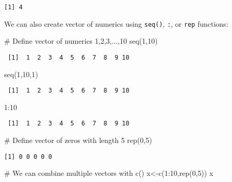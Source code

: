 \documentclass[
  letterpaper,
  DIV=11,
  numbers=noendperiod]{scrartcl}
\newenvironment{Shaded}{\begin{snugshade}}{\end{snugshade}}
\newcommand{\CommentTok}[1]{\textcolor[rgb]{0.37,0.37,0.37}{#1}}
\newcommand{\DecValTok}[1]{\textcolor[rgb]{0.68,0.00,0.00}{#1}}
\newcommand{\FunctionTok}[1]{\textcolor[rgb]{0.28,0.35,0.67}{#1}}
\newcommand{\NormalTok}[1]{\textcolor[rgb]{0.00,0.23,0.31}{#1}}
\newcommand{\OtherTok}[1]{\textcolor[rgb]{0.00,0.23,0.31}{#1}}
\newcommand{\SpecialCharTok}[1]{\textcolor[rgb]{0.37,0.37,0.37}{#1}}
\begin{document}
\begin{verbatim}
[1] 4
\end{verbatim}

We can also create vector of numerics using \texttt{seq()}, \texttt{:},
or \texttt{rep} functions:

\begin{Shaded}
\begin{Highlighting}[]
\CommentTok{\# Define vector of numerics 1,2,3,...,10}
\FunctionTok{seq}\NormalTok{(}\DecValTok{1}\NormalTok{,}\DecValTok{10}\NormalTok{)}
\end{Highlighting}
\end{Shaded}

\begin{verbatim}
 [1]  1  2  3  4  5  6  7  8  9 10
\end{verbatim}

\begin{Shaded}
\begin{Highlighting}[]
\FunctionTok{seq}\NormalTok{(}\DecValTok{1}\NormalTok{,}\DecValTok{10}\NormalTok{,}\DecValTok{1}\NormalTok{)}
\end{Highlighting}
\end{Shaded}

\begin{verbatim}
 [1]  1  2  3  4  5  6  7  8  9 10
\end{verbatim}

\begin{Shaded}
\begin{Highlighting}[]
\DecValTok{1}\SpecialCharTok{:}\DecValTok{10}
\end{Highlighting}
\end{Shaded}

\begin{verbatim}
 [1]  1  2  3  4  5  6  7  8  9 10
\end{verbatim}

\begin{Shaded}
\begin{Highlighting}[]
\CommentTok{\# Define vector of zeros with length 5}
\FunctionTok{rep}\NormalTok{(}\DecValTok{0}\NormalTok{,}\DecValTok{5}\NormalTok{)}
\end{Highlighting}
\end{Shaded}

\begin{verbatim}
[1] 0 0 0 0 0
\end{verbatim}

\begin{Shaded}
\begin{Highlighting}[]
\CommentTok{\# We can combine multiple vectors with c()}
\NormalTok{x}\OtherTok{\textless{}{-}}\FunctionTok{c}\NormalTok{(}\DecValTok{1}\SpecialCharTok{:}\DecValTok{10}\NormalTok{,}\FunctionTok{rep}\NormalTok{(}\DecValTok{0}\NormalTok{,}\DecValTok{5}\NormalTok{))}
\NormalTok{x}
\end{Highlighting}
\end{Shaded}
\end{document}
